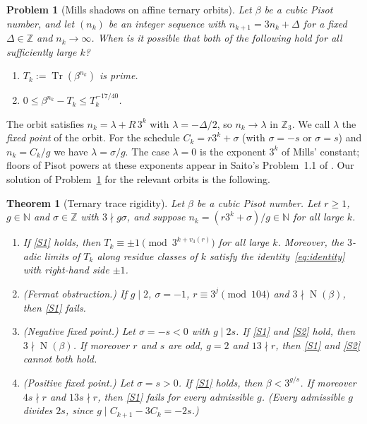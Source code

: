 \documentclass[11pt,a4paper]{article}
\newtheorem{rthm}{Theorem}
\newtheorem{pprob}{Problem}
\theoremstyle{definition}
\theoremstyle{remark}
\newcommand{\Z}{\mathbb{Z}}
\newcommand{\N}{\mathbb{N}}
\DeclareMathOperator{\Tr}{Tr}
\DeclareMathOperator{\Nm}{N}
\begin{document}
\begin{pprob}[Mills shadows on affine ternary orbits]\label{prob:shadow}
Let $\beta$ be a cubic Pisot number, and let $(n_k)$ be an integer sequence with $n_{k+1}=3n_k+\Delta$ for a fixed $\Delta\in\Z$ and $n_k\to\infty$.
When is it possible that both of the following hold for all sufficiently large $k$?
\begin{enumerate}[label=\textup{(S\arabic*)}]
\item\label{S1} $T_k:=\Tr(\beta^{n_k})$ is prime.
\item\label{S2} $0\le\beta^{n_k}-T_k\le T_k^{-17/40}$.
\end{enumerate}
\end{pprob}

The orbit satisfies $n_k=\lambda+R\,3^k$ with $\lambda=-\Delta/2$, so $n_k\to\lambda$ in $\Z_3$.
We call $\lambda$ the \emph{fixed point} of the orbit.
For the schedule $C_k=r3^k+\sigma$ (with $\sigma=-s$ or $\sigma=s$) and $n_k=C_k/g$ we have $\lambda=\sigma/g$.
The case $\lambda=0$ is the exponent $3^k$ of Mills' constant; floors of Pisot powers at these exponents appear in Saito's Problem~1.1 of \cite{SaiInt}.
Our solution of Problem~\ref{prob:shadow} for the relevant orbits is the following.

\begin{rthm}[Ternary trace rigidity]\label{thm:rigidity}
Let $\beta$ be a cubic Pisot number. Let $r\ge1$, $g\in\N$ and $\sigma\in\Z$ with $3\nmid g\sigma$, and suppose $n_k=(r3^k+\sigma)/g\in\N$ for all large $k$.
\begin{enumerate}[label=\textup{(\roman*)}]
\item If \ref{S1} holds, then $T_k\equiv\pm1\pmod{3^{k+v_3(r)}}$ for all large $k$. Moreover, the $3$-adic limits of $T_k$ along residue classes of $k$ satisfy the identity~\eqref{eq:identity} with right-hand side $\pm1$.
\item \textup{(Fermat obstruction.)} If $g\mid2$, $\sigma=-1$, $r\equiv 3^j\pmod{104}$ and $3\nmid\Nm(\beta)$, then \ref{S1} fails.
\item \textup{(Negative fixed point.)} Let $\sigma=-s<0$ with $g\mid 2s$. If \ref{S1} and \ref{S2} hold, then $3\nmid\Nm(\beta)$. If moreover $r$ and $s$ are odd, $g=2$ and $13\nmid r$, then \ref{S1} and \ref{S2} cannot both hold.
\item \textup{(Positive fixed point.)} Let $\sigma=s>0$. If \ref{S1} holds, then $\beta<3^{g/s}$. If moreover $4s\nmid r$ and $13s\nmid r$, then \ref{S1} fails for every admissible $g$. (Every admissible $g$ divides $2s$, since $g\mid C_{k+1}-3C_k=-2s$.)
\end{enumerate}
\end{rthm}
\end{document}
